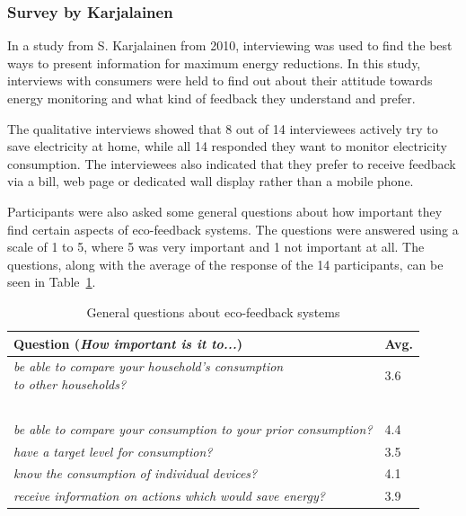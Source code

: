 \documentclass[journal]{vgtc}                %
\begin{document}
\subsubsection{Survey by Karjalainen}
In a study from S. Karjalainen \cite{karjalainen2011consumer} from 2010, interviewing was used to find the best ways to present information for maximum energy reductions. In this study, interviews with consumers were held to find out about their attitude towards energy monitoring and what kind of feedback they understand and prefer.

The qualitative interviews showed that 8 out of 14 interviewees actively try to save electricity at home, while all 14 responded they want to monitor electricity consumption. The interviewees also indicated that they prefer to receive feedback via a bill, web page or dedicated wall display rather than a mobile phone.

Participants were also asked some general questions about how important they find certain aspects of eco-feedback systems. The questions were answered using a scale of 1 to 5, where 5 was very important and 1 not important at all. The questions, along with the average of the response of the 14 participants, can be seen in Table~\ref{prototypesquestions}.

\begin{table}
  \caption{General questions about eco-feedback systems  \cite{karjalainen2011consumer}}
  \label{prototypesquestions}
  \scriptsize
  \begin{center}
    \begin{tabular}{|ll|}
    \hline
       Question (\textit{How important is it to...}) & Avg. \\ \hline
       \pbox{20cm}{\textit{be able to compare your household's consumption}\\\textit{to other households?}} & 3.6 \\ ~\\[-0.25cm]
       \textit{be able to compare your consumption to your prior consumption?} & 4.4 \\ 
       \textit{have a target level for consumption?} & 3.5 \\ 
       \textit{know the consumption of individual devices?} & 4.1 \\ 
       \textit{receive information on actions which would save energy?} & 3.9 \\
       \hline
    \end{tabular}
  \end{center}
\end{table}
\end{document}
